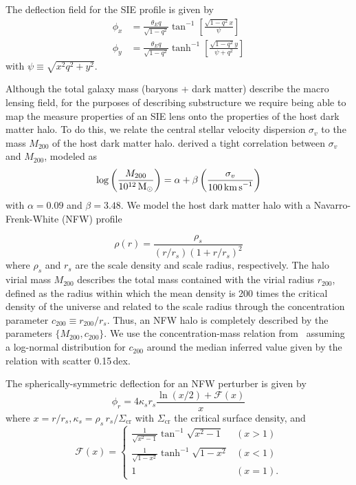 \documentclass[twocolumn]{aastex62}
\begin{document}
The deflection field for the SIE profile is given by~\citep{2001astro.ph..2341K}
\begin{align}
\phi_{x} &=\frac{\theta_E q}{\sqrt{1-q^{2}}} \tan ^{-1}\left[\frac{\sqrt{1-q^{2}} x}{\psi}\right] \\
\phi_{y} &=\frac{\theta_E q}{\sqrt{1-q^{2}}} \tanh ^{-1}\left[\frac{\sqrt{1-q^{2}} y}{\psi+q^{2} }\right]
\end{align}
with $\psi \equiv \sqrt{x^2 q^2 + y^2}$.

Although the total galaxy mass (baryons + dark matter) describe the macro lensing field, for the purposes of describing substructure we require being able to map the measure properties of an SIE lens onto the properties of the host dark matter halo. To do this, we relate the central stellar velocity dispersion $\sigma_v$ to the mass $M_{200}$ of the host dark matter halo. \citet{2018ApJ...859...96Z} derived a tight correlation between $\sigma_v$ and $M_{200}$, modeled as
\begin{equation}
\log\left(\frac{M_{200}}{10^{12}\,\Msun}\right) = \alpha + \beta\left(\frac{\sigma_v}{100\,\kmps}\right)
\label{eq:sigma_v_M_200_relation}
\end{equation}
with $\alpha = 0.09$ and $\beta = 3.48$. %
We model the host dark matter halo with a Navarro-Frenk-White (NFW) profile~\citep{1996ApJ...462..563N,1997ApJ...490..493N}

\begin{equation}
\rho(r)=\frac{\rho_{s}}{\left(r / r_{s}\right)\left(1+r / r_{s}\right)^{2}}
\label{eq:rhoNFW}
\end{equation}
where $\rho_s$ and $r_s$ are the scale density and scale radius, respectively. The halo virial mass $M_{200}$ describes the total mass contained with the virial radius $r_{200}$, defined as the radius within which the mean density is 200 times the critical density of the universe and related to the scale radius through the concentration parameter $c_{200} \equiv r_{200}/r_s$. Thus, an NFW halo is completely described by the parameters $\{M_{200}, c_{200}\}$. We use the concentration-mass relation from~\citet{2014MNRAS.442.2271S} assuming a log-normal distribution for $c_{200}$ around the median inferred value given by the relation with scatter 0.15\,dex.

The spherically-symmetric deflection for an NFW perturber is given by~\citep{2001astro.ph..2341K}
\begin{equation}
\phi_{r}=4 \kappa_{s} r_{s} \frac{\ln (x / 2)+\mathcal{F}(x)}{x}
\end{equation}
where $x = r/r_s, \kappa_s = \rho_s\,r_s/\Sigma_\mathrm{cr}$ with $\Sigma_\mathrm{cr}$ the critical surface density, and
\begin{equation}
\mathcal{F}(x)=\left\{\begin{array}{ll}{\frac{1}{\sqrt{x^{2}-1}} \tan ^{-1} \sqrt{x^{2}-1}} & {(x>1)} \\ {\frac{1}{\sqrt{1-x^{2}}} \tanh ^{-1} \sqrt{1-x^{2}}} & {(x<1)} \\ {1} & {(x=1).}\end{array}\right.
\label{eq:Fx}
\end{equation}
\end{document}
